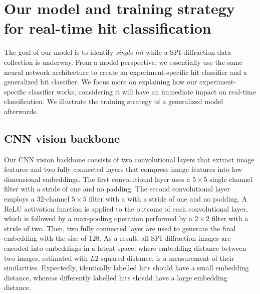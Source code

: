 




















\section{Our model and training strategy for real-time hit classification}

The goal of our model is to identify \textit{single-hit} while a SPI diffraction
data collection is underway.  From a model perspective, we essentially use the
same neural network architecture to create an experiment-specific hit classifier
and a generalized hit classifier.  We focus more on explaining how our
experiment-specific classifier works, considering it will have an immediate
impact on real-time classification.  We illustrate the training strategy of a
generalized model afterwards.  


\subsection{CNN vision backbone}

Our CNN vision backbone consists of two convolutional layers that extract image
features and two fully connected layers that compress image features into low
dimensional embeddings.  The first convolutional layer uses a $5 \times 5$
single channel filter with a stride of one and no padding.  The second
convolutional layer employs a 32-channel $5 \times 5$ filter with a with a
stride of one and no padding.  A ReLU activation function is applied to the
outcome of each convolutional layer, which is followed by a max-pooling
operation performed by a $2\times 2$ filter with a stride of two.  Then, two
fully connected layer are used to generate the final embedding with the size of
128.  As a result, all SPI diffraction images are encoded into embeddings in a
latent space, where embedding distance between two images, estimated with $L2$
squared distance, is a measurement of their similarities.  Expectedly,
identically labelled hits should have a small embedding distance, whereas
differently labelled hits should have a large embedding distance.  


